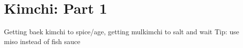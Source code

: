 \chapter*{Kimchi: Part 1}
\renewcommand{\chaptertitle}{Kimchi: Part 1}

Getting baek kimchi to spice/age, getting mulkimchi to salt and wait
Tip: use miso instead of fish sauce
